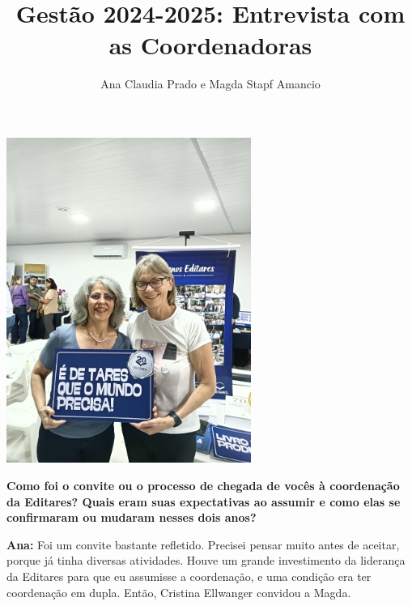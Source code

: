 \documentclass{gescons}
\author{Ana Claudia Prado e Magda Stapf Amancio}
\title{Gestão 2024-2025: Entrevista com as Coordenadoras}
\begin{document}
    \makeentrevistatitle



    \begin{multicols}{2}


    \begin{center}
        \includegraphics[width=8cm,trim={100 0 100 1100},clip]{articles/resumo/fotos/materia2/IMG20241208144410.jpg}
    \end{center}



\textbf{Como foi o convite ou o processo de chegada de vocês à coordenação da Editares? Quais eram suas expectativas ao assumir e como elas se confirmaram ou mudaram nesses dois anos?}

\textbf{Ana:} Foi um convite bastante refletido. Precisei pensar muito antes de aceitar, porque já tinha diversas atividades. Houve um grande investimento da liderança da Editares para que eu assumisse a coordenação, e uma condição era ter coordenação em dupla. Então, Cristina Ellwanger convidou a Magda.


\end{multicols}
\end{document}

